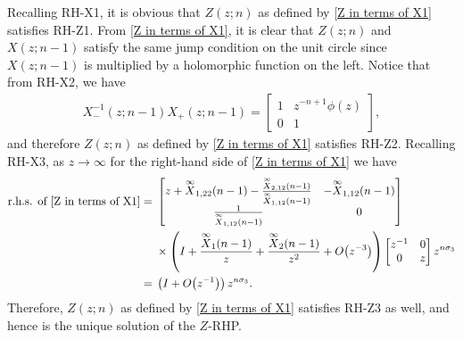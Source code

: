 \documentclass[pdftex]{sigma}
\numberwithin{equation}{section}
\newcommand{\di}{\displaystyle}
\begin{document}
	Recalling {\rm RH-X1}, it is obvious that $Z(z;n)$ as defined by \eqref{Z in terms of X1} satisfies {\rm RH-Z1}. From \eqref{Z in terms of X1}, it is clear that $Z(z;n)$ and $X(z;n-1)$ satisfy the same jump condition on the unit circle since~${X(z;n-1)}$ is multiplied by a holomorphic function on the left. Notice that from {\rm RH-X2}, we have
	\begin{equation*}
		\begin{split}
			X^{-1}_-(z;n-1)X_+(z;n-1) = \begin{bmatrix}
				1 & z^{-n+1}\phi(z) \\
				0 & 1
			\end{bmatrix},
		\end{split}
	\end{equation*}
	and therefore $Z(z;n)$ as defined by \eqref{Z in terms of X1} satisfies {\rm RH-Z2}. Recalling {\rm RH-X3}, as $z \to \infty$ for the right-hand side of \eqref{Z in terms of X1} we have
	\begin{align*}%
			\text{r.h.s. of \eqref{Z in terms of X1}} ={}&
			\begin{bmatrix}
				z + \overset{\infty}{X}_{1,22}(n-1) - \tfrac{\overset{\infty}{X}_{2,12}(n-1)}{\overset{\infty}{X}_{1,12}(n-1)} & -\overset{\infty}{X}_{1,12}(n-1) \\
				\tfrac{1}{\overset{\infty}{X}_{1,12}(n-1)} & 0
			\end{bmatrix} \\ & \times \left(\di I+\frac{ \overset{\infty}{X}_1(n-1)}{z}+\frac{\overset{\infty}{X}_2(n-1)}{z^2} + O\big(z^{-3}\big)\right) \begin{bmatrix}
				z^{-1} & 0 \\
				0 & z
			\end{bmatrix} z^{n \sigma_3} \\ ={}& \left( I + O\big(z^{-1}\big) \right) z^{n \sigma_3}.
	\end{align*}
	Therefore, $Z(z;n)$ as defined by \eqref{Z in terms of X1} satisfies {\rm RH-Z3} as well, and hence is the unique solution of the $Z$-RHP.
	
\end{document}
